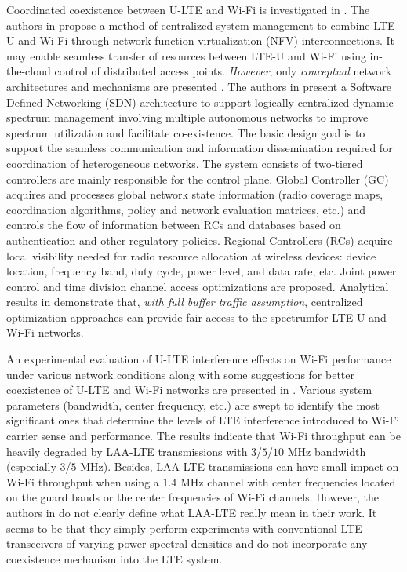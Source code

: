 \documentclass[12pt,onecolumn]{article}
\begin{document}
Coordinated coexistence between U-LTE and Wi-Fi is investigated in \cite{U-LTE-5G-2015, Coordinated-LTE-U-Wi-Fi-2015}. The authors in \cite{U-LTE-5G-2015} propose a method of centralized system management to combine LTE-U and Wi-Fi through network function virtualization (NFV) interconnections. It may enable seamless transfer of resources between LTE-U and Wi-Fi using in-the-cloud control of distributed access points. \textit{However}, only \textit{conceptual} network architectures and mechanisms are presented \cite{U-LTE-5G-2015}. The authors in \cite{Coordinated-LTE-U-Wi-Fi-2015} present a Software Defined Networking (SDN) architecture to support logically-centralized dynamic spectrum management involving multiple autonomous networks to improve spectrum utilization and facilitate co-existence. The basic design goal is to support the seamless communication and information dissemination required for coordination of heterogeneous networks. The system consists of two-tiered controllers are mainly responsible for the control plane. Global Controller (GC) acquires and processes global network state information (radio coverage maps, coordination algorithms, policy and network evaluation matrices, etc.) and controls the flow of information between RCs and databases based on authentication and other regulatory policies. Regional Controllers (RCs) acquire local visibility needed for radio resource allocation at wireless devices: device location, frequency band, duty cycle, power level, and data rate, etc. Joint power control and time division channel access optimizations are proposed. Analytical results in \cite{Coordinated-LTE-U-Wi-Fi-2015} demonstrate that, \textit{with full buffer traffic assumption}, centralized optimization approaches can provide fair access to the spectrumfor LTE-U and Wi-Fi networks.

An experimental evaluation of U-LTE interference effects on Wi-Fi performance under various network conditions along with some suggestions for better coexistence of U-LTE and Wi-Fi networks are presented in \cite{LTE-U-Experiment-ICC-WS-2015}. Various system parameters (bandwidth, center frequency, etc.) are swept to identify the most significant ones that determine the levels of LTE interference introduced to Wi-Fi carrier sense and performance. The results indicate that Wi-Fi throughput can be heavily degraded by LAA-LTE transmissions with $3$/$5$/$10$ MHz bandwidth (especially $3$/$5$ MHz). Besides, LAA-LTE transmissions can have small impact on Wi-Fi throughput when using a $1.4$ MHz channel with center frequencies located on the guard bands or the center frequencies of Wi-Fi channels. However, the authors in \cite{LTE-U-Experiment-ICC-WS-2015} do not clearly define what LAA-LTE really mean in their work. It seems to be that they simply perform experiments with conventional LTE transceivers of varying power spectral densities and do not incorporate any coexistence mechanism into the LTE system.
\end{document}
